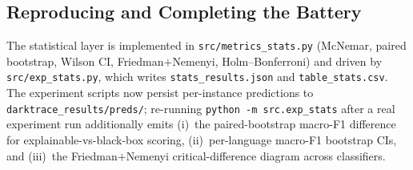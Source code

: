 \documentclass[11pt,a4paper]{article}
\begin{document}
\subsection{Reproducing and Completing the Battery}
The statistical layer is implemented in \texttt{src/metrics\_stats.py} (McNemar, paired
bootstrap, Wilson CI, Friedman$+$Nemenyi, Holm--Bonferroni) and driven by
\texttt{src/exp\_stats.py}, which writes \texttt{stats\_results.json} and
\texttt{table\_stats.csv}. The experiment scripts now persist per-instance predictions
to \texttt{darktrace\_results/preds/}; re-running \texttt{python -m src.exp\_stats} after
a real experiment run additionally emits (i)~the paired-bootstrap macro-F1 difference for
explainable-vs-black-box scoring, (ii)~per-language macro-F1 bootstrap CIs, and (iii)~the
Friedman$+$Nemenyi critical-difference diagram across classifiers.
\end{document}
